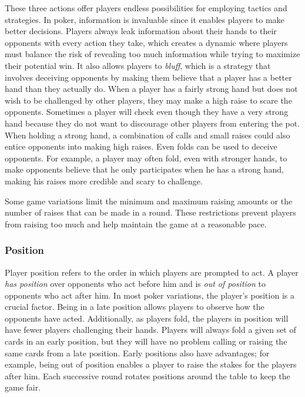 These three actions offer players endless possibilities for employing tactics and strategies. In poker, information is invaluable since it enables players to make better decisions. Players always leak information about their hands to their opponents with every action they take, which creates a dynamic where players must balance the risk of revealing too much information while trying to maximize their potential win. It also allows players to \textit{bluff}, which is a strategy that involves deceiving opponents by making them believe that a player has a better hand than they actually do. When a player has a fairly strong hand but does not wish to be challenged by other players, they may make a high raise to scare the opponents. Sometimes a player will check even though they have a very strong hand because they do not want to discourage other players from entering the pot. When holding a strong hand, a combination of calls and small raises could also entice opponents into making high raises. Even folds can be used to deceive opponents. For example, a player may often fold, even with stronger hands, to make opponents believe that he only participates when he has a strong hand, making his raises more credible and scary to challenge. 

Some game variations limit the minimum and maximum raising amounts or the number of raises that can be made in a round. These restrictions prevent players from raising too much and help maintain the game at a reasonable pace.


\subsubsection{Position}
Player position refers to the order in which players are prompted to act. A player \textit{has position} over opponents who act before him and is \textit{out of position} to opponents who act after him. In most poker variations, the player's position is a crucial factor. Being in a late position allows players to observe how the opponents have acted. Additionally, as players fold, the players in position will have fewer players challenging their hands. Players will always fold a given set of cards in an early position, but they will have no problem calling or raising the same cards from a late position. Early positions also have advantages; for example, being out of position enables a player to raise the stakes for the players after him. Each successive round rotates positions around the table to keep the game fair.




